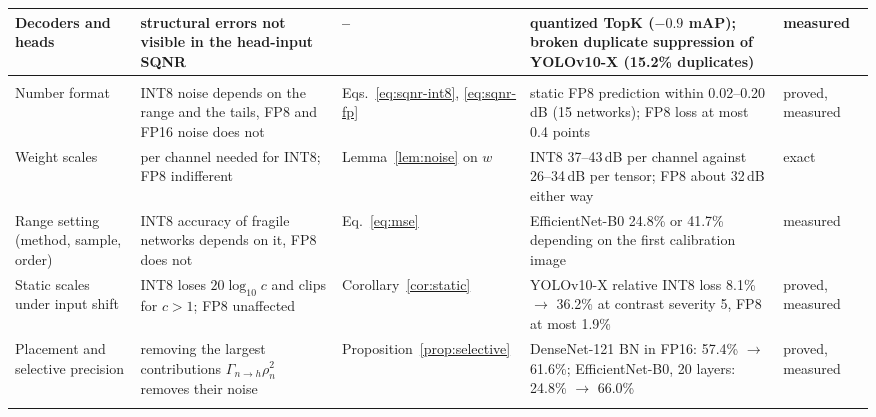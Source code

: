\documentclass[pdflatex,sn-mathphys-num]{sn-jnl}%
\theoremstyle{thmstyleone}%
\theoremstyle{thmstyletwo}%
\theoremstyle{thmstylethree}%
\begin{document}
\begin{appendices}
\begin{table}[htbp]
\begin{tabular}{@{}>{\raggedright\arraybackslash}p{2.1cm}>{\raggedright\arraybackslash}p{3.1cm}>{\raggedright\arraybackslash}p{2.2cm}>{\raggedright\arraybackslash}p{3.4cm}>{\raggedright\arraybackslash}p{1.4cm}@{}}
Decoders and heads & structural errors not visible in the head-input SQNR & -- & quantized TopK ($-0.9$ mAP); broken duplicate suppression of YOLOv10-X (15.2\% duplicates) & measured \\
\midrule
\multicolumn{5}{@{}l}{\emph{Quantization choices}} \\
Number format & INT8 noise depends on the range and the tails, FP8 and FP16 noise does not & Eqs.~\eqref{eq:sqnr-int8}, \eqref{eq:sqnr-fp} & static FP8 prediction within 0.02--0.20\,dB (15 networks); FP8 loss at most 0.4 points & proved, measured \\
Weight scales & per channel needed for INT8; FP8 indifferent & Lemma~\ref{lem:noise} on $w$ & INT8 37--43\,dB per channel against 26--34\,dB per tensor; FP8 about 32\,dB either way & exact \\
Range setting (method, sample, order) & INT8 accuracy of fragile networks depends on it, FP8 does not & Eq.~\eqref{eq:mse} & EfficientNet-B0 24.8\% or 41.7\% depending on the first calibration image & measured \\
Static scales under input shift & INT8 loses $20\log_{10}c$ and clips for $c>1$; FP8 unaffected & Corollary~\ref{cor:static} & YOLOv10-X relative INT8 loss 8.1\% $\to$ 36.2\% at contrast severity 5, FP8 at most 1.9\% & proved, measured \\
Placement and selective precision & removing the largest contributions $\Gamma_{n\to h}\rho_n^2$ removes their noise & Proposition~\ref{prop:selective} & DenseNet-121 BN in FP16: 57.4\% $\to$ 61.6\%; EfficientNet-B0, 20 layers: 24.8\% $\to$ 66.0\% & proved, measured \\
\botrule
\end{tabular}
\end{table}


\end{appendices}
\end{document}

